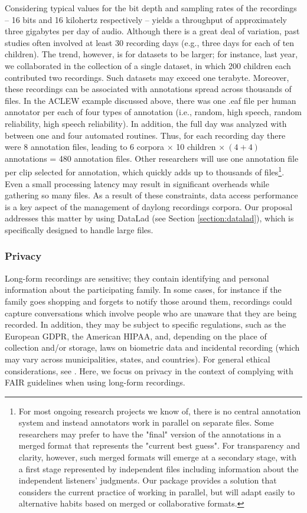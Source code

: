 \documentclass[smallextended]{svjour3}       %
\begin{document}
Considering typical values for the bit depth and sampling rates of the recordings -- 16 bits and 16 kilohertz respectively -- yields a throughput of approximately three gigabytes per day of audio. Although there is a great deal of variation, past studies often involved at least 30 recording days (e.g., three days for each of ten children). The trend, however, is for datasets to be larger; for instance, last year, we collaborated in the collection of a single dataset, in which 200 children each contributed two recordings. Such datasets may exceed one terabyte. Moreover, these recordings can be associated with annotations spread across thousands of files. In the ACLEW example discussed above, there was one .eaf file per human annotator per each of four types of annotation (i.e., random, high speech, random reliability, high speech reliability). In addition, the full day was analyzed with between one and four automated routines. Thus, for each recording day there were 8 annotation files, leading to 6 corpora $\times$ 10 children $\times \ (4+4)$  annotations = 480 annotation files. Other researchers will use one annotation file per clip selected for annotation, which quickly adds up to thousands of files\footnote{For most ongoing research projects we know of, there is no central annotation system and instead annotators work in parallel on separate files. Some researchers may prefer to have the "final" version of the annotations in a merged format that represents the "current best guess". For transparency and clarity, however, such merged formats will emerge at a secondary stage, with a first stage represented by independent files including information about the independent listeners' judgments. Our package provides a solution that considers the current practice of working in parallel, but will adapt easily to alternative habits based on merged or collaborative formats.}. Even a small processing latency may result in significant overheads while gathering so many files. As a result of these constraints, data access performance is a key aspect of the management of daylong recordings corpora. Our proposal addresses this matter by using DataLad (see Section \ref{section:datalad}), which is specifically designed to handle large files.


\subsubsection*{Privacy}

Long-form recordings are sensitive; they contain identifying and personal information about the participating family. In some cases, for instance if the family goes shopping and forgets to notify those around them, recordings could capture conversations which involve people who are unaware that they are being recorded. In addition, they may be subject to specific regulations, such as the European GDPR, the American HIPAA, and, depending on the place of collection and/or storage, laws on biometric data and incidental recording (which may vary across municipalities, states, and countries). For general ethical considerations, see \citet{Cychosz2020}. Here, we focus on privacy in the context of complying with FAIR guidelines when using long-form recordings.
\end{document}
